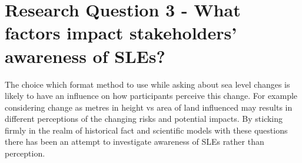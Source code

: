 \section{Research Question 3 - What factors impact stakeholders' awareness of SLEs? }


The choice which format method to use while asking about sea level changes is likely to have an influence on how participants perceive this change. For example considering change as metres in height vs area of land influenced may results in different perceptions of the changing risks and potential impacts.  By sticking firmly in the realm of historical fact and scientific models with these questions there has been an attempt to investigate awareness of SLEs rather than perception. 












